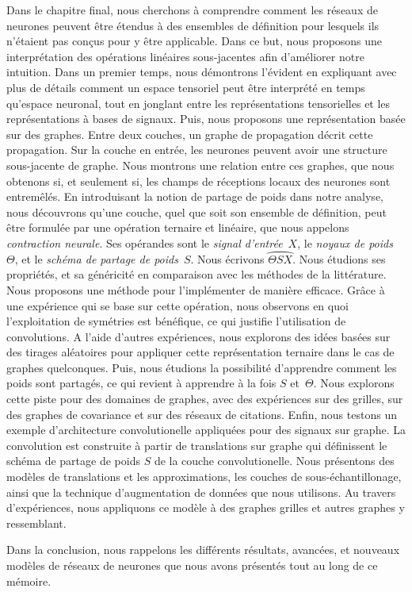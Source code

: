 Dans le chapitre final, nous cherchons à comprendre comment les réseaux de neurones peuvent être étendus à des ensembles de définition pour lesquels ils n'étaient pas conçus pour y être applicable. Dans ce but, nous proposons une interprétation des opérations linéaires sous-jacentes afin d'améliorer notre intuition. Dans un premier temps, nous démontrons l'évident en expliquant avec plus de détails comment un espace tensoriel peut être interprété en temps qu'espace neuronal, tout en jonglant entre les représentations tensorielles et les représentations à bases de signaux. Puis, nous proposons une représentation basée sur des graphes. Entre deux couches, un graphe de propagation décrit cette propagation. Sur la couche en entrée, les neurones peuvent avoir une structure sous-jacente de graphe. Nous montrons une relation entre ces graphes, que nous obtenons si, et seulement si, les champs de réceptions locaux des neurones sont entremêlés. En introduisant la notion de partage de poids dans notre analyse, nous découvrons qu'une couche, quel que soit son ensemble de définition, peut être formulée par une opération ternaire et linéaire, que nous appelons \emph{contraction neurale}. Ses opérandes sont le \emph{signal d'entrée}~$X$, le \emph{noyaux de poids}~$\Theta$, et le \emph{schéma de partage de poids}~$S$. Nous écrivons $\wideparen{\Theta S X}$. Nous étudions ses propriétés, et sa généricité en comparaison avec les méthodes de la littérature. Nous proposons une méthode pour l'implémenter de manière efficace. Grâce à une expérience qui se base sur cette opération, nous observons en quoi l'exploitation de symétries est bénéfique, ce qui justifie l'utilisation de convolutions. A l'aide d'autres expériences, nous explorons des idées basées sur des tirages aléatoires pour appliquer cette représentation ternaire dans le cas de graphes quelconques. Puis, nous étudions la possibilité d'apprendre comment les poids sont partagés, ce qui revient à apprendre à la fois $S$ et~$\Theta$. Nous explorons cette piste pour des domaines de graphes, avec des expériences sur des grilles, sur des graphes de covariance et sur des réseaux de citations. Enfin, nous testons un exemple d'architecture convolutionelle appliquées pour des signaux sur graphe. La convolution est construite à partir de translations sur graphe qui définissent le schéma de partage de poids $S$ de la couche convolutionelle. Nous présentons des modèles de translations et les approximations, les couches de sous-échantillonage, ainsi que la technique d'augmentation de données que nous utilisons. Au travers d'expériences, nous appliquons ce modèle à des graphes grilles et autres graphes y ressemblant.

\vspace{0.2cm}
Dans la conclusion, nous rappelons les différents résultats, avancées, et nouveaux modèles de réseaux de neurones que nous avons présentés tout au long de ce mémoire.